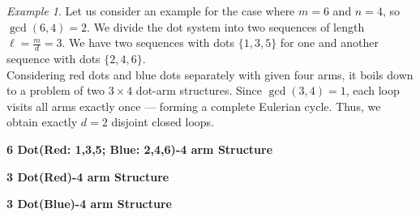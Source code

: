 \documentclass[12pt,a4paper]{article}
\theoremstyle{remark} %
\theoremstyle{example} %
\newtheorem{example}{Example}
\theoremstyle{proposition}
\begin{document}
\begin{example}
    Let us consider an example for the case where \( m = 6 \) and \( n = 4 \), so \( \gcd(6,4) = 2 \). We divide the dot system into two sequences of length \( \ell = \frac{m}{d} = 3 \). We have two sequences with dots \( \{1,3,5\} \)  for one and another sequence with dots \( \{2,4,6\} \).\\
    Considering red dots and blue dots separately with given four arms, it boils down to a problem of two $3\times4$ dot-arm structures. Since \( \gcd(3,4) = 1 \), each loop visits all arms exactly once — forming a complete Eulerian cycle. Thus, we obtain exactly \( d = 2 \) disjoint closed loops.
\begin{center}
\textbf{6 Dot(Red: 1,3,5; Blue: 2,4,6)-4 arm Structure }
\end{center}
\begin{center}
\end{center}

\begin{minipage}[t]{0.48\textwidth}
\centering
\textbf{3 Dot(Red)-4 arm Structure}

\end{minipage}
\hfill
\begin{minipage}[t]{0.48\textwidth}
\centering
\textbf{3 Dot(Blue)-4 arm Structure}


\end{minipage}
\end{example}
\end{document}
